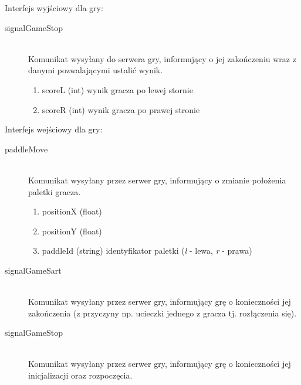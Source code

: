 Interfejs wyjściowy dla gry: 

\begin{description}
	\item[signalGameStop] \hfill \\
	Komunikat wysyłany do serwera gry, informujący o jej zakończeniu wraz z danymi pozwalającymi ustalić wynik.
	\begin{enumerate}
		\item scoreL (int) wynik gracza po lewej stornie
		\item scoreR (int) wynik gracza po prawej stronie
	\end{enumerate}
\end{description}

Interfejs wejściowy dla gry:

\begin{description}
	\item[paddleMove] \hfill \\
	Komunikat wysyłany przez serwer gry, informujący o zmianie położenia paletki gracza.
	\begin{enumerate}
		\item positionX (float)
		\item positionY (float)
		\item paddleId (string) identyfikator paletki (\emph{l} - lewa, \emph{r} - prawa)
	\end{enumerate}
\end{description}

\begin{description}
	\item[signalGameSart] \hfill \\
	Komunikat wysyłany przez serwer gry, informujący grę o konieczności jej zakończenia (z przyczyny np. ucieczki jednego z gracza tj. rozłączenia się).
\end{description}

\begin{description}
	\item[signalGameStop] \hfill \\
	Komunikat wysyłany przez serwer gry, informujący grę o konieczności jej inicjalizacji oraz rozpoczęcia.
\end{description}
